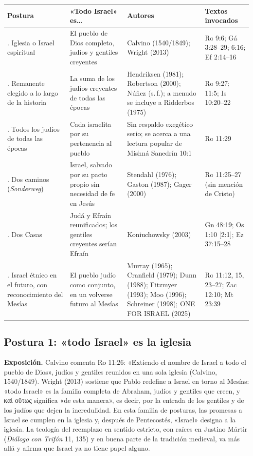 \documentclass[11pt,letterpaper]{article}
\newcommand{\grc}[1]{\foreignlanguage{ancientgreek}{#1}}
\begin{document}
\begin{center}\footnotesize
\renewcommand{\arraystretch}{1.3}
\begin{tabular}{>{\RaggedRight\arraybackslash}p{2.6cm}>{\RaggedRight\arraybackslash}p{4.3cm}>{\RaggedRight\arraybackslash}p{3.4cm}>{\RaggedRight\arraybackslash}p{3.7cm}}
\toprule
\textbf{Postura} & \textbf{«Todo Israel» es\ldots} & \textbf{Autores} & \textbf{Textos invocados}\\
\midrule
1. Iglesia o Israel espiritual & El pueblo de Dios completo, judíos y gentiles creyentes & Calvino (1540/1849); Wright (2013) & Ro 9:6; Gá 3:28--29; 6:16; Ef 2:14--16\\
2. Remanente elegido a lo largo de la historia & La suma de los judíos creyentes de todas las épocas & Hendriksen (1981); Robertson (2000); Núñez (s.\,f.); a menudo se incluye a Ridderbos (1975) & Ro 9:27; 11:5; Is 10:20--22\\
3. Todos los judíos de todas las épocas & Cada israelita por su pertenencia al pueblo & Sin respaldo exegético serio; se acerca a una lectura popular de Mishná Sanedrín 10:1 & Ro 11:29\\
4. Dos caminos (\emph{Sonderweg}) & Israel, salvado por su pacto propio sin necesidad de fe en Jesús & Stendahl (1976); Gaston (1987); Gager (2000) & Ro 11:25--27 (sin mención de Cristo)\\
5. Dos Casas & Judá y Efraín reunificados; los gentiles creyentes serían Efraín & Koniuchowsky (2003) & Gn 48:19; Os 1:10 [2:1]; Ez 37:15--28\\
6. Israel étnico en el futuro, con reconocimiento del Mesías & El pueblo judío como conjunto, en un volverse futuro al Mesías & Murray (1965); Cranfield (1979); Dunn (1988); Fitzmyer (1993); Moo (1996); Schreiner (1998); ONE FOR ISRAEL (2025) & Ro 11:12, 15, 23--27; Zac 12:10; Mt 23:39\\
\bottomrule
\end{tabular}\end{center}

\subsection{Postura 1: «todo Israel» es la iglesia}
\textbf{Exposición.} Calvino comenta Ro 11:26: «Extiendo el nombre de Israel a todo el pueblo de Dios», judíos y gentiles reunidos en una sola iglesia (Calvino, 1540/1849). Wright (2013) sostiene que Pablo redefine a Israel en torno al Mesías: «todo Israel» es la familia completa de Abraham, judíos y gentiles que creen, y \grc{καὶ οὕτως} significa «de esta manera», es decir, por la entrada de los gentiles y de los judíos que dejen la incredulidad. En esta familia de posturas, las promesas a Israel se cumplen en la iglesia y, después de Pentecostés, «Israel» designa a la iglesia. La teología del reemplazo en sentido estricto, con raíces en Justino Mártir (\emph{Diálogo con Trifón} 11, 135) y en buena parte de la tradición medieval, va más allá y afirma que Israel ya no tiene papel alguno.
\end{document}
